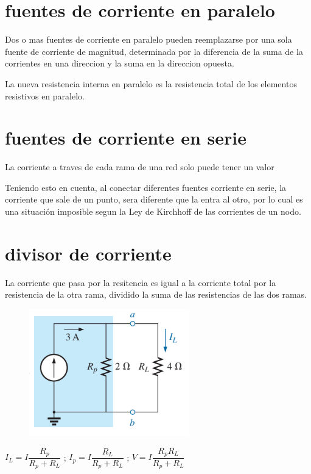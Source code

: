 \section*{fuentes de corriente en paralelo}
\justifying
Dos o mas fuentes de corriente en paralelo pueden reemplazarse por una sola fuente de corriente de magnitud, determinada por la diferencia de la suma de la corrientes en una direccion y la suma en la direccion opuesta.

La nueva resistencia interna en paralelo es la resistencia total de los elementos resistivos en paralelo.
\section*{fuentes de corriente en serie}
\justifying
La corriente a traves de cada rama de una red solo puede tener un valor

Teniendo esto en cuenta, al conectar diferentes fuentes corriente en serie, la corriente que sale de un punto, sera diferente que la entra al otro, por lo cual es una situación imposible segun la Ley de Kirchhoff de las corrientes de un nodo.
\section*{divisor de corriente}
\justifying
La corriente que pasa por la resitencia es igual a la corriente total por la resistencia de la otra rama, dividido la suma de las resistencias de las dos ramas.
\begin{figure}[h]
	\centering
	\includegraphics[width=0.5\linewidth]{imagenes/screenshot001}
	\label{fig:screenshot001}
\end{figure}

\centering $ I_L = I \dfrac{R_p}{R_p + R_L} $ ;
\centering $ I_p = I \dfrac{R_L}{R_p + R_L} $ ;
\centering $ V = I \dfrac{R_p R_L}{R_p + R_L} $

